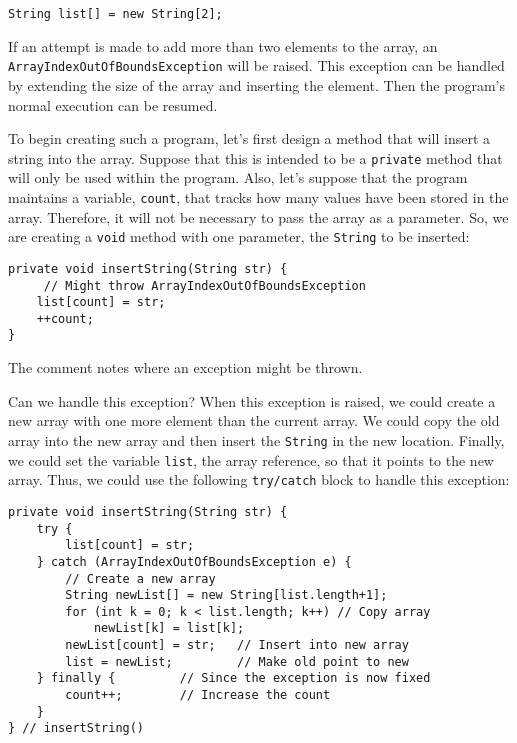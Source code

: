 \begin{jjjlisting}
\begin{lstlisting}
String list[] = new String[2];
\end{lstlisting}
\end{jjjlisting}

\noindent If an attempt is made to add more than
two elements to the array, an \mbox{\tt ArrayIndexOutOfBoundsException}
will be raised.  This exception can be handled by extending the size of
the array and inserting the element.  Then the program's normal
execution can be resumed.

To begin creating such a program, let's first design a method that
will insert a string into the
 array.  Suppose that this is intended
to be a {\tt private} method that will only be used within the
program.  Also, let's suppose that the program maintains a variable,
{\tt count}, that tracks how many values have been stored in the
array.  Therefore, it will not be necessary to pass the array as a
parameter.  So, we are creating a {\tt void} method with one
parameter, the {\tt String} to be inserted:

\begin{jjjlisting}
\begin{lstlisting}
private void insertString(String str) {
     // Might throw ArrayIndexOutOfBoundsException
    list[count] = str; 
    ++count;
}
\end{lstlisting}
\end{jjjlisting}

\noindent The comment notes where an exception might be thrown.

Can we handle this exception?  When this exception is raised, we could
create a new array with one more element than the current array.  We
could copy the old array into the new array and then insert the
{\tt String} in the new location.  Finally, we could set the variable
{\tt list}, the array reference, so that it points to the new array.
Thus, we could use the following {\tt try/catch} block to handle this
exception:

\begin{jjjlisting}
\begin{lstlisting}
private void insertString(String str) {
    try {
        list[count] = str;
    } catch (ArrayIndexOutOfBoundsException e) {
        // Create a new array
        String newList[] = new String[list.length+1];
        for (int k = 0; k < list.length; k++) // Copy array
            newList[k] = list[k];
        newList[count] = str;   // Insert into new array
        list = newList;         // Make old point to new
    } finally {         // Since the exception is now fixed
        count++;        // Increase the count
    }
} // insertString()
\end{lstlisting}
\end{jjjlisting}

